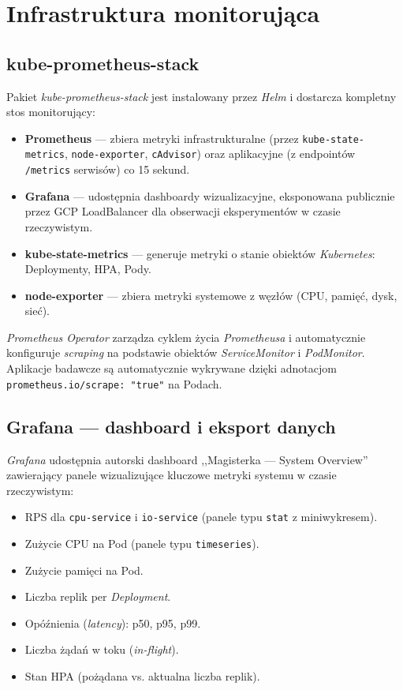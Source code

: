 \section{Infrastruktura monitorująca}

\subsection{kube-prometheus-stack}

Pakiet \textit{kube-prometheus-stack} jest instalowany przez \textit{Helm} i dostarcza kompletny stos monitorujący:

\begin{itemize}
  \item \textbf{Prometheus} — zbiera metryki infrastrukturalne (przez \texttt{kube-state-metrics}, \texttt{node-exporter}, \texttt{cAdvisor}) oraz aplikacyjne (z endpointów \texttt{/metrics} serwisów) co 15 sekund.
  \item \textbf{Grafana} — udostępnia dashboardy wizualizacyjne, eksponowana publicznie przez GCP LoadBalancer dla obserwacji eksperymentów w czasie rzeczywistym.
  \item \textbf{kube-state-metrics} — generuje metryki o stanie obiektów \textit{Kubernetes}: Deploymenty, HPA, Pody.
  \item \textbf{node-exporter} — zbiera metryki systemowe z węzłów (CPU, pamięć, dysk, sieć).
\end{itemize}

\textit{Prometheus Operator} zarządza cyklem życia \textit{Prometheusa} i automatycznie konfiguruje \textit{scraping} na podstawie obiektów \textit{ServiceMonitor} i \textit{PodMonitor}. Aplikacje badawcze są automatycznie wykrywane dzięki adnotacjom \texttt{prometheus.io/scrape: "true"} na Podach.

\subsection{Grafana — dashboard i eksport danych}

\textit{Grafana} udostępnia autorski dashboard ,,Magisterka — System Overview'' zawierający panele wizualizujące kluczowe metryki systemu w czasie rzeczywistym:

\begin{itemize}
  \item RPS dla \texttt{cpu-service} i \texttt{io-service} (panele typu \texttt{stat} z miniwykresem).
  \item Zużycie CPU na Pod (panele typu \texttt{timeseries}).
  \item Zużycie pamięci na Pod.
  \item Liczba replik per \textit{Deployment}.
  \item Opóźnienia (\textit{latency}): p50, p95, p99.
  \item Liczba żądań w toku (\textit{in-flight}).
  \item Stan HPA (pożądana vs. aktualna liczba replik).
\end{itemize}

